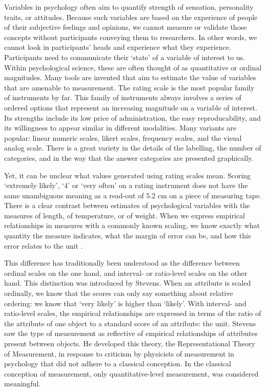 \documentclass[utf8]{FrontiersinVancouver}
\begin{document}
Variables in psychology often aim to quantify strength of sensation, personality traits, or attitudes. Because such variables are based on the experience of people of their subjective feelings and opinions, we cannot measure or validate those concepts without participants conveying them to researchers. In other words, we cannot look in participants' heads and experience what they experience. Participants need to communicate their `state' of a variable of interest to us. Within psychological science, these are often thought of as quantitative or ordinal magnitudes. Many tools are invented that aim to estimate the value of variables that are amenable to measurement. The rating scale is the most popular family of instruments by far. This family of instruments always involves a series of ordered options that represent an increasing magnitude on a variable of interest. Its strengths include its low price of administration, the easy reproducability, and its willingness to appear similar in different modalities. Many variants are popular: linear numeric scales, likert scales, frequency scales, and the visual analog scale. There is a great variety in the details of the labelling, the number of categories, and in the way that the answer categories are presented graphically.  

Yet, it can be unclear what values generated using rating scales mean. Scoring `extremely likely', `4' or `very often' on a rating instrument does not have the same unambiguous meaning as a read-out of 5.2 cm on a piece of measuring tape. There is a clear contrast between estimates of psychological variables with the measures of length, of temperature, or of weight. When we express empirical relationships in measures with a commonly known scaling, we know exactly what quantity the measure indicates, what the margin of error can be, and how this error relates to the unit . 

This difference has traditionally been understood as the difference between ordinal scales on the one hand, and interval- or ratio-level scales on the other hand. This distinction was introduced by Stevens. When an attribute is scaled ordinally, we know that the scores can only say something about relative ordering: we know that `very likely' is higher than `likely'. With interval- and ratio-level scales, the empirical relationships are expressed in terms of the ratio of the attribute of one object to a standard score of an attribute: the unit. Stevens saw the type of measurement as reflective of empirical relationships of attributes present between objects. He developed this theory, the Representational Theory of Measurement, in response to criticism by physicists of measurement in psychology that did not adhere to a classical conception. In the classical conception of measurement, only quantitative-level measurement, was considered meaningful.
\end{document}
